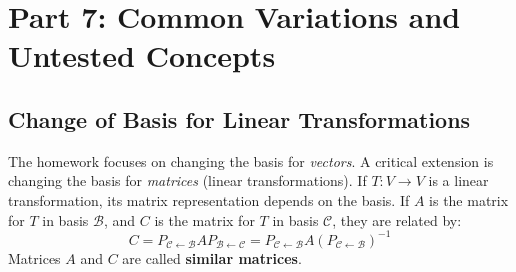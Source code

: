 \documentclass[11pt]{article}
\begin{document}
\section{Part 7: Common Variations and Untested Concepts}

\subsection{Change of Basis for Linear Transformations}
The homework focuses on changing the basis for \textit{vectors}. A critical extension is changing the basis for \textit{matrices} (linear transformations). If $T: V \to V$ is a linear transformation, its matrix representation depends on the basis.
If $A$ is the matrix for $T$ in basis $\mathcal{B}$, and $C$ is the matrix for $T$ in basis $\mathcal{C}$, they are related by:
\[ C = P_{\mathcal{C} \leftarrow \mathcal{B}} A P_{\mathcal{B} \leftarrow \mathcal{C}} = P_{\mathcal{C} \leftarrow \mathcal{B}} A (P_{\mathcal{C} \leftarrow \mathcal{B}})^{-1} \]
Matrices $A$ and $C$ are called \textbf{similar matrices}.
\end{document}
